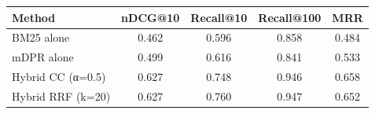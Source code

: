 \begin{tabular}{lcccc}
\toprule
Method & nDCG@10 & Recall@10 & Recall@100 & MRR \\
\midrule
BM25 alone & 0.462 & 0.596 & 0.858 & 0.484 \\
mDPR alone & 0.499 & 0.616 & 0.841 & 0.533 \\
Hybrid CC (α=0.5) & 0.627 & 0.748 & 0.946 & 0.658 \\
Hybrid RRF (k=20) & 0.627 & 0.760 & 0.947 & 0.652 \\
\bottomrule
\end{tabular}
